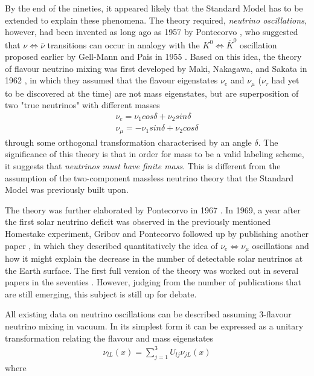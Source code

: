 \documentclass[english]{article}
\begin{document}
    By the end of the nineties, it appeared likely that the Standard Model has to be extended to explain these phenomena. The theory required, \textit{neutrino oscillations}, however, had been invented as long ago as 1957 by Pontecorvo \cite{pontecorvo1957}, who suggested that $\nu \Leftrightarrow \bar{\nu}$ transitions can occur in analogy with the $K^{0} \Leftrightarrow \bar{K}^{0}$ oscillation proposed earlier by Gell-Mann and Pais in 1955 \cite{gellmann1955}. Based on this idea, the theory of flavour neutrino mixing was first developed by Maki, Nakagawa, and Sakata in 1962 \cite{mns1962}, in which they assumed that the flavour eigenstates $\nu_{e}$ and $\nu_{\mu}$ ($\nu_{\tau}$ had yet to be discovered at the time) are not mass eigenstates, but are superposition of two "true neutrinos" with different masses
    \begin{gather}
    	\nu_{e} = \nu_{1} cos\delta + \nu_{2} sin\delta \\
        \nu_{\mu} = -\nu_{1} sin\delta + \nu_{2} cos\delta
    \end{gather}
    through some orthogonal transformation characterised by an angle $\delta$. The significance of this theory is that in order for mass to be a valid labeling scheme, it suggests that \textit{neutrinos must have finite mass}. This is different from the assumption of the two-component massless neutrino theory that the Standard Model was previously built upon.
    
    The theory was further elaborated by Pontecorvo in 1967 \cite{pontecorvo1967}. In 1969, a year after the first solar neutrino deficit was observed in the previously mentioned Homestake experiment, Gribov and Pontecorvo followed up by publishing another paper \cite{pontecorvo1969}, in which they described quantitatively the idea of $\nu_{e} \Leftrightarrow \nu_{\mu}$ oscillations and how it might explain the decrease in the number of detectable solar neutrinos at the Earth surface. The first full version of the theory was worked out in several papers in the seventies \cite{fulltheory70s}. However, judging from the number of publications that are still emerging, this subject is still up for debate.
    
    All existing data on neutrino oscillations can be described assuming
3-flavour neutrino mixing in vacuum. In its simplest form it can be expressed as a unitary transformation relating the flavour and mass eigenstates
	\begin{gather}
    	\nu_{lL} (x) = \sum_{j=1}^{3} U_{lj} \nu_{jL} (x)
    \end{gather}
    where
    
\end{document}
